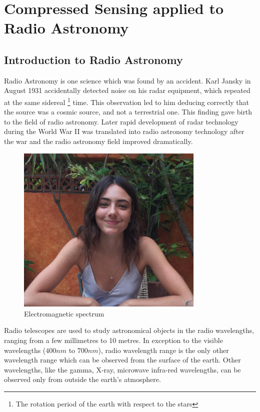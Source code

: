 \chapter{Compressed Sensing applied to Radio Astronomy}

\section{Introduction to Radio Astronomy}
 Radio Astronomy is one science which was found by an accident. Karl Jansky in August 1931 accidentally
 detected noise on his radar equipment, which repeated at the same sidereal \footnote{The rotation period of the earth with respect to the stars} time.
 This observation led to him deducing correctly that the source was a cosmic source, and not a terrestrial 
 one. This finding gave birth to the field of radio astronomy. Later rapid development of radar technology during the World War
II was translated into radio astronomy technology after the war and the radio astronomy field improved dramatically.
 
 \begin{figure}[h]
	\centering
	\includegraphics[width=0.8\textwidth]{images/em.png}	
	 \caption[Electromagnetic spectrum ]{\small Electromagnetic spectrum\footnotemark}
	\label{fig:iparch1}
\end{figure}
 
 Radio telescopes are used to study astronomical objects in the radio wavelengths, ranging from a few millimetres to 10 metres. In exception to the visible wavelengths ($400nm$ to $700nm$), radio wavelength range is the only other wavelength range which can be observed from the surface of
the earth. Other wavelengths, like the gamma, X-ray, microwave infra-red wavelengths, can be observed only from outside the earth's atmosphere.

